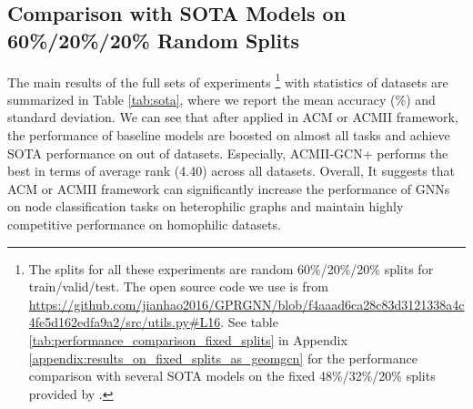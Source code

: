 \documentclass{article}
\newcommand{\0}{{\boldsymbol{0}}}
\newcommand{\6}{{\partial}}
\newcommand{\8}{{\infty}}
\newcommand{\4}{{\nabla}}
\begin{document}
\subsection{Comparison with SOTA Models on 60\%/20\%/20\% Random Splits}
\label{sec:full_result_comparison}
The main results of the full sets of experiments \footnote{The splits for all these experiments are random 60\%/20\%/20\% splits for train/valid/test. The open source code we use is from \url{https://github.com/jianhao2016/GPRGNN/blob/f4aaad6ca28c83d3121338a4c4fe5d162edfa9a2/src/utils.py\#L16}. See table \ref{tab:performance_comparison_fixed_splits} in Appendix \ref{appendix:results_on_fixed_splits_as_geomgcn} for the performance comparison with several SOTA models on the fixed 48\%/32\%/20\% splits provided by \cite{pei2020geom}.} with statistics of datasets are summarized in Table \ref{tab:sota}, where we report the mean accuracy (\%) and standard deviation. We can see that after applied in ACM or ACMII framework, the performance of baseline models are boosted on almost all tasks and achieve SOTA performance on  out of  datasets. Especially, ACMII-GCN+ performs the best in terms of average rank (4.40) across all datasets. Overall, It suggests that ACM or ACMII framework can significantly increase the performance of GNNs on node classification tasks on heterophilic graphs and maintain highly competitive performance on homophilic datasets.
\end{document}
